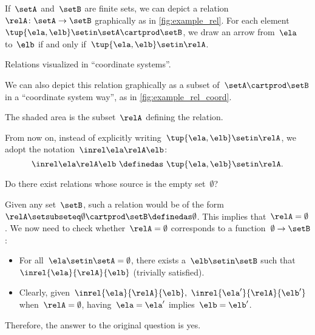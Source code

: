 If~$\setA$ and~$\setB$ are finite sets, we can depict a relation~$\relA \colon \setA \to \setB$ graphically as in \cref{fig:example_rel}.
For each element~$\tup{\ela,\elb} \setin \setA \cartprod \setB$, we draw an arrow from~$\ela$ to~$\elb$ if and only if~$\tup{\ela,\elb} \setin \relA$.

\begin{marginfigure}
    \centering
    \caption{Relations visualized in ``coordinate systems''.}
    \label{fig:example_rel_coord}
\end{marginfigure}

We can also depict this relation graphically as a subset of~$\setA \cartprod \setB$ in a ``coordinate system way'', as in \cref{fig:example_rel_coord}.

The shaded area is the subset~$\relA$ defining the relation.

\begin{remark}
    From now on, instead of explicitly writing~$\tup{\ela,\elb}\setin \relA$, we adopt the notation~$\inrel \ela \relA \elb$:
    \begin{equation*}
        \inrel \ela \relA \elb \ \definedas\  \tup{\ela,\elb}\setin \relA.
    \end{equation*}
\end{remark}

\begin{exercise}
    Do there exist relations whose source is the empty set~$\emptyset$?
\end{exercise}
\begin{solution}
    Given any set~$\setB$, such a relation would be of the form~$\relA \setsubseteq \emptyset \cartprod \setB \definedas \emptyset$.
    This implies that~$\relA=\emptyset$.
    We now need to check whether~$\relA=\emptyset$ corresponds to a function~$\emptyset\to \setB$:
    \begin{itemize}
        \item For all~$\ela\setin \setA=\emptyset$, there exists a~$\elb \setin \setB$ such that $\inrel{\ela}{\relA}{\elb}$ (trivially satisfied).
        \item Clearly, given~$\inrel{\ela}{\relA}{\elb},~\inrel{\ela'}{\relA}{\elb'}$ when~$\relA=\emptyset$, having~$\ela=\ela'$ implies~$\elb=\elb'$.
    \end{itemize}
    Therefore, the answer to the original question is yes.
\end{solution}

